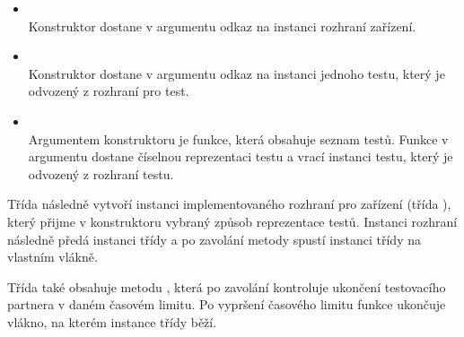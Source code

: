 \begin{itemize} 
    \item {} \\
    Konstruktor dostane v argumentu odkaz na instanci rozhraní zařízení.
    \item {} \\
    Konstruktor dostane v argumentu odkaz na instanci jednoho testu, který je odvozený z rozhraní pro test.
    \item {} \\
    Argumentem konstruktoru je funkce, která obsahuje seznam testů. Funkce v argumentu dostane číselnou reprezentaci testu a vrací instanci testu, který je odvozený z rozhraní testu.
\end{itemize}

Třída následně vytvoří instanci implementovaného rozhraní pro zařízení (třída ), který přijme v konstruktoru vybraný způsob reprezentace testů. Instanci rozhraní následně předá instanci třídy  a po zavolání metody  spustí instanci třídy  na vlastním vlákně.

Třída také obsahuje metodu , která po zavolání kontroluje ukončení testovacího partnera v daném časovém limitu. Po vypršení časového limitu funkce ukončuje vlákno, na kterém instance třídy  běží.

